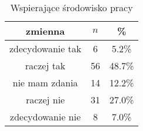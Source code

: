 \begin{table}[H]
\caption{Wspierające środowisko pracy}
\centering
\begin{tabular}{ | c | c | c |}
\hline
zmienna & $n$ & \% \\
\hline
zdecydowanie tak  &  6  & 5.2\% \\
\hline
raczej tak  &  56  & 48.7\% \\
\hline
nie mam zdania  &  14  & 12.2\% \\
\hline
raczej nie  &  31  & 27.0\% \\
\hline
zdecydowanie nie  &  8  & 7.0\% \\
\hline
\end{tabular}
\label{tab:Q7}
\end{table}
